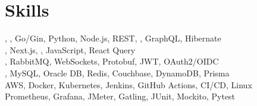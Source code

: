 \section*{Skills}
\BigDivider
\small
\noindent
{} , , Go/Gin, Python, Node.js, REST, , GraphQL, Hibernate\\
 , Next.js, , JavaScript, React Query\\
 , RabbitMQ, WebSockets, Protobuf, JWT, OAuth2/OIDC\\
 , MySQL, Oracle DB, Redis, Couchbase, DynamoDB, Prisma\\
 AWS, Docker, Kubernetes, Jenkins, GitHub Actions, CI/CD, Linux\\
 Prometheus, Grafana, JMeter, Gatling, JUnit, Mockito, Pytest
\normalsize